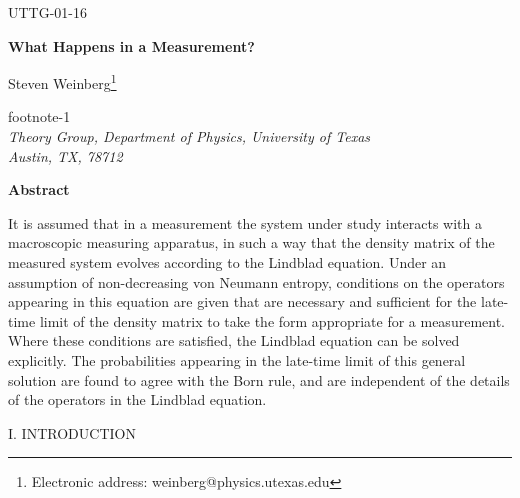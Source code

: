 \def\fnote#1#2{\begingroup\def\thefootnote{#1}\footnote{#2}\addtocounter
{footnote}{-1}\endgroup}
\def\BM#1{\mbox{\boldmath{$#1$}}}





\hfill{UTTG-01-16 }


\vspace{36pt}


\begin{center}
{\large {\bf {What Happens in a Measurement?}}}


\vspace{36pt}
Steven Weinberg\fnote{*}{Electronic address:
weinberg@physics.utexas.edu}\\
{\em Theory Group, Department of Physics, University of
Texas\\
Austin, TX, 78712}


\vspace{30pt}

\noindent
{\bf Abstract}
\end{center}

\vspace{10pt}

\noindent
It is assumed that in a measurement the system  under study interacts with a macroscopic measuring apparatus, in such a way that the density matrix of the measured system  evolves according to the Lindblad equation.  Under an assumption of non-decreasing von Neumann entropy, conditions on the operators appearing in this equation are given that are necessary and sufficient for the late-time limit of the density matrix to take the form appropriate for a measurement. Where these conditions are satisfied, the Lindblad equation can be solved explicitly.  The probabilities appearing in the late-time limit of this general solution are found to agree with the Born rule, and are independent of the details of the operators in the Lindblad equation.


\vfill

\pagebreak



\begin{center}
I. INTRODUCTION
\end{center}		

